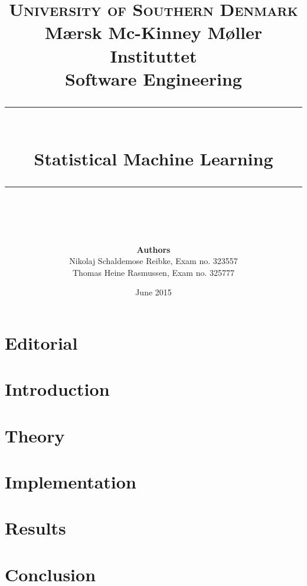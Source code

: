\documentclass[11pt]{article}
\newcommand{\romanTitle}[1]{\MakeUppercase{\thepage}\hspace{0.2cm}#1}
\begin{document}
\title {
	\textsc{\LARGE University of Southern Denmark}\\
	\large Mærsk Mc-Kinney Møller Instituttet\\[1cm]
	\Large Software Engineering\\
	\rule{\linewidth}{0.4pt}\\[0.4cm]Statistical Machine Learning\\\rule{\linewidth}{0.4pt}\\[0.5cm] }

\author{ 
	\textbf{Authors}\\Nikolaj Schaldemose Reibke,  Exam no. 323557\\Thomas Heine Rasmussen, Exam no. 325777
}
\date{\vfill June 2015}
\maketitle
\thispagestyle{empty}
\clearpage
\setcounter{page}{1}

\pagestyle{fancy}
\setlength{\headheight}{25.2pt} 


\rfoot{}
\cfoot{\MakeUppercase{\thepage}}
\lfoot{}

\section*{Editorial}

\newpage

\renewcommand\contentsname{\romanTitle{Table of contents}}
\tableofcontents
\newpage

\setcounter{page}{1}
\rfoot{}
\lfoot{}

\section{Introduction}


\section{Theory}


\section{Implementation}


\section{Results}


\section{Conclusion}

\end{document}
